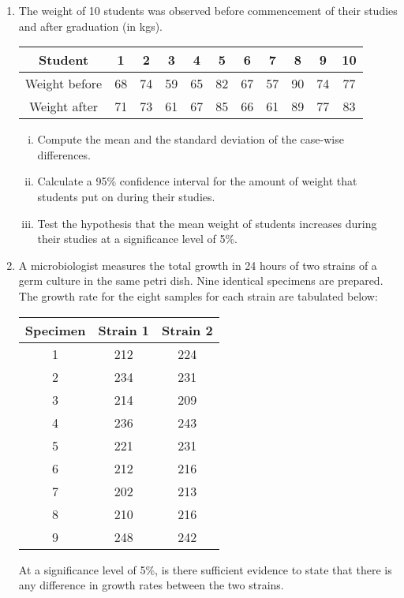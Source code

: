 \documentclass[]{article}
\begin{document}
\begin{enumerate}
\item 

The weight of 10 students was observed before commencement of their studies and after graduation (in kgs).

\begin{center}
    \begin{tabular}{|c||c|c|c|c|c|c|c|c|c|c|} \hline 
Student &	1&	2	&3	&4	&5	&6	&7	&8	&9	&10\\ \hline 
Weight before &	68	& 74	& 59	& 65	& 82&67&57&90&74&77\\ \hline 
Weight after&71&73&61&67&85&66&61&89&77&83\\ \hline 
\end{tabular}
\end{center}


\begin{enumerate}[(i)]
\item Compute the mean and the standard deviation of the case-wise differences.
	\item  Calculate a 95\% confidence interval for the amount of weight that students put on during their studies. 
	\item   Test the hypothesis that the mean weight of students increases during their studies at a significance level of  5\%. 
\end{enumerate}


\item A microbiologist measures the total growth in 24 hours of two strains of a germ culture  in the same petri dish. Nine identical specimens are prepared. The growth rate for the eight samples for each strain are tabulated below:

\begin{center}
	\begin{tabular}{|c|c|c|} \hline 
		Specimen &	Strain 1	&	Strain 2	\\ \hline \hline
		1 & 212 & 224 \\ \hline
		2 & 234 & 231 \\ \hline
		3 & 214 & 209 \\ \hline
		4 & 236 & 243 \\ \hline
		5 & 221 & 231 \\ \hline 
		6 & 212 & 216 \\ \hline
		7 & 202 & 213 \\ \hline 
		8 & 210 & 216 \\ \hline
		9 & 248 & 242 \\ \hline
	\end{tabular} 
\end{center}
\noindent At a significance level of 5\%, is there sufficient evidence to state that there is any difference in growth rates between the two strains.



\end{enumerate}
\end{document}
